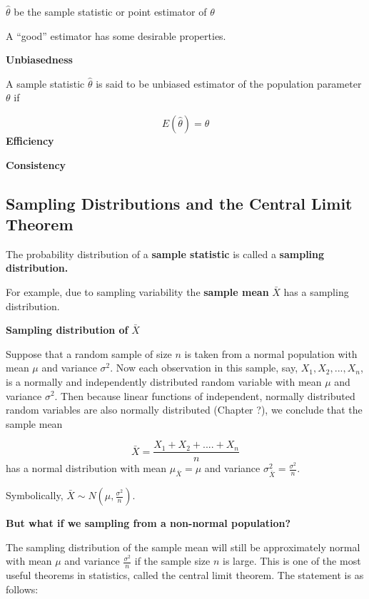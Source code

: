\documentclass[
  11pt,
  letterpaper,
  DIV=11,
  numbers=noendperiod]{scrreprt}
\begin{document}
\(\hat \theta\) be the sample statistic or point estimator of \(\theta\)

A ``good'' estimator has some desirable properties.

\textbf{Unbiasedness}

A sample statistic \(\hat \theta\) is said to be unbiased estimator of
the population parameter \(\theta\) if

\[E(\hat\theta)=\theta\] \textbf{Efficiency}

\textbf{Consistency}

\subsection{Sampling Distributions and the Central Limit
Theorem}\label{sampling-distributions-and-the-central-limit-theorem}

The probability distribution of a \textbf{sample statistic} is called a
\textbf{sampling distribution.}

For example, due to sampling variability the \textbf{sample mean}
\(\bar X\) has a sampling distribution.

\textbf{Sampling distribution of} \(\bar X\)

Suppose that a random sample of size \(n\) is taken from a normal
population with mean \(\mu\) and variance \(\sigma^2\). Now each
observation in this sample, say, \(X_1, X_2,...,X_n\), is a normally and
independently distributed random variable with mean \(\mu\) and variance
\(\sigma^2\). Then because linear functions of independent, normally
distributed random variables are also normally distributed (Chapter ?),
we conclude that the sample mean

\[\bar X=\frac{X_1+X_2+....+X_n}{n}\] has a normal distribution with
mean \(\mu_{\bar X}=\mu\) and variance
\(\sigma^2_{\bar X}=\frac{\sigma^2}{n}\).

Symbolically, \(\bar X \sim N(\mu,\frac{\sigma^2}{n})\).

\textbf{But what if we sampling from a non-normal population?}

The sampling distribution of the sample mean will still be approximately
normal with mean \(\mu\) and variance \(\frac{\sigma^2}{n}\) if the
sample size \(n\) is large. This is one of the most useful theorems in
statistics, called the central limit theorem. The statement is as
follows:
\end{document}
